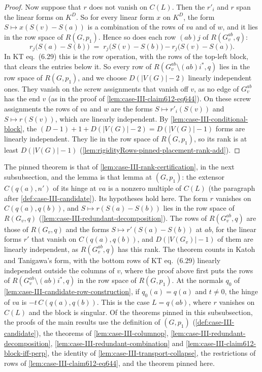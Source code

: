 \begin{proof}
  Now suppose that $r$ does not vanish on $C(L)$. Then the $r'_i$ and $r$
  span the linear forms on $K^D$. So for every linear form $x$ on $K^D$,
  the form $S \mapsto x(S(v) - S(a))$ is a combination of the rows of
  $va$ and of $w$, and it lies in the row space of $R(G, p_1)$. Hence so
  does each row $(ab)j$ of $R(G_v^{ab}, q)$:
  \[
    r_j\bigl(S(a) - S(b)\bigr)
    \;=\; r_j\bigl(S(v) - S(b)\bigr) - r_j\bigl(S(v) - S(a)\bigr).
  \]
  In KT eq.~(6.29) this is the row operation, with the rows of the
  top-left block, that clears the entries below it. So every row of
  $R(G_v^{ab} \setminus (ab)i^*, q)$ lies in the row space of
  $R(G, p_1)$, and we choose $D(|V(G)| - 2)$ linearly independent ones.
  They vanish on the screw assignments that vanish off $v$, as no edge of
  $G_v^{ab}$ has the end $v$ (as in the proof of
  \cref{lem:case-III-claim612-eq644}). On these screw assignments the
  rows of $va$
  and $w$ are the forms $S \mapsto r'_i(S(v))$ and $S \mapsto r(S(v))$,
  which are linearly independent. By \cref{lem:case-III-conditional-block},
  the $(D - 1) + 1 + D(|V(G)| - 2) = D(|V(G)| - 1)$ forms are linearly
  independent. They lie in the row space of $R(G, p_1)$, so its rank is
  at least $D(|V(G)| - 1)$
  (\cref{lem:rigidityRows-pinned-placement-rank-add}).
\end{proof}

\begin{fmlnote}
  The pinned theorem is that of \cref{lem:case-III-rank-certification},
  in the next subsubsection, and the lemma is that lemma at $(G, p_1)$:
  the extensor $C(q(a), n')$ of its hinge at $va$ is a nonzero multiple
  of $C(L)$ (the paragraph after \cref{def:case-III-candidate}). Its
  hypotheses hold here. The form $r$ vanishes on $C(q(a), q(b))$, and
  $S \mapsto r(S(a) - S(b))$ lies in the row space of $R(G_v, q)$
  (\cref{lem:case-III-redundant-decomposition}). The rows of
  $R(G_v^{ab}, q)$ are those of $R(G_v, q)$ and the forms
  $S \mapsto r'(S(a) - S(b))$ at $ab$, for the linear forms $r'$ that
  vanish on $C(q(a), q(b))$, and $D(|V(G_v)| - 1)$ of them are linearly
  independent, as $R(G_v^{ab}, q)$ has this rank. The theorem counts in
  Katoh and Tanigawa's form, with the bottom rows of KT eq.~(6.29)
  linearly independent outside the columns of $v$, where the proof above
  first puts the rows of $R(G_v^{ab} \setminus (ab)i^*, q)$ in the row
  space of $R(G, p_1)$. At the normals $q_0$ of
  \cref{lem:case-III-candidate-row-construction}, if $q_0(a) = q(a)$ and
  $t \neq 0$, the hinge of $va$ is $-t\,C(q(a), q(b))$. This is the case
  $L = q(ab)$, where $r$ vanishes on $C(L)$ and the block is singular.
  Of the theorems pinned in this subsubsection, the proofs of the main
  results use the definition of $(G, p_1)$
  (\cref{def:case-III-candidate}), the theorems of
  \cref{lem:case-III-columnop}, \cref{lem:case-III-redundant-decomposition},
  \cref{lem:case-III-redundant-combination} and
  \cref{lem:case-III-claim612-block-iff-perp}, the identity of
  \cref{lem:case-III-transport-collapse}, the restrictions of rows of
  \cref{lem:case-III-claim612-eq644}, and the theorem pinned here.
\end{fmlnote}

